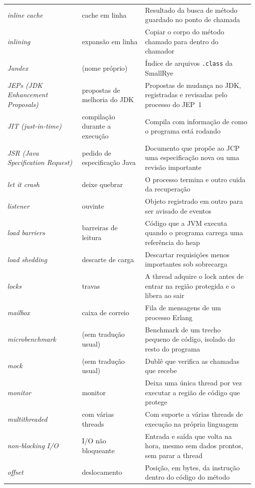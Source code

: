 \begin{longtable}{@{}>{\raggedright}p{3.9cm} >{\raggedright}p{3.6cm} >{\raggedright\arraybackslash}p{6.3cm}@{}}
\textit{inline cache} & cache em linha & Resultado da busca de método guardado no ponto de chamada \\
\textit{inlining} & expansão em linha & Copiar o corpo do método chamado para dentro do chamador \\
\textit{Jandex} & (nome próprio) & Índice de arquivos \texttt{.class} da SmallRye \\
\textit{JEPs (JDK Enhancement Proposals)} & propostas de melhoria do JDK & Propostas de mudança no JDK, registradas e revisadas pelo processo do JEP~1 \\
\textit{JIT (just-in-time)} & compilação durante a execução & Compila com informação de como o programa está rodando \\
\textit{JSR (Java Specification Request)} & pedido de especificação Java & Documento que propõe ao JCP uma especificação nova ou uma revisão importante \\
\textit{let it crash} & deixe quebrar & O processo termina e outro cuida da recuperação \\
\textit{listener} & ouvinte & Objeto registrado em outro para ser avisado de eventos \\
\textit{load barriers} & barreiras de leitura & Código que a JVM executa quando o programa carrega uma referência do heap \\
\textit{load shedding} & descarte de carga & Descartar requisições menos importantes sob sobrecarga \\
\textit{locks} & travas & A thread adquire o lock antes de entrar na região protegida e o libera ao sair \\
\textit{mailbox} & caixa de correio & Fila de mensagens de um processo Erlang \\
\textit{microbenchmark} & (sem tradução usual) & Benchmark de um trecho pequeno de código, isolado do resto do programa \\
\textit{mock} & (sem tradução usual) & Dublê que verifica as chamadas que recebe \\
\textit{monitor} & monitor & Deixa uma única thread por vez executar a região de código que protege \\
\textit{multithreaded} & com várias threads & Com suporte a várias threads de execução na própria linguagem \\
\textit{non-blocking I/O} & I/O não bloqueante & Entrada e saída que volta na hora, mesmo sem dados prontos, sem parar a thread \\
\textit{offset} & deslocamento & Posição, em bytes, da instrução dentro do código do método \\

\end{longtable}
